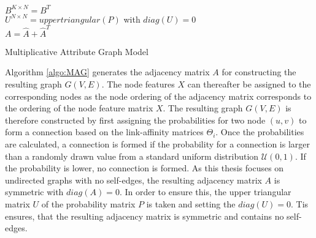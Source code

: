 	\begin{algorithm}[h]
		\scriptsize
		\SetAlgoLined
		\nl $B^{K \times N} = B^{T}$ \\
		\nl {}
		\nl $U^{N \times N} = uppertriangular(P)$ with $diag(U)=0$\\
		\nl {}
		\nl $A = \hat A + \hat A^{T}$

		\caption{Multiplicative Attribute Graph Model}
		\label{algo:MAG}
	\end{algorithm}

	\noindent Algorithm \ref{algo:MAG} generates the adjacency matrix $A$ for
	constructing the resulting graph $G(V,E)$. The node features $X$ can
	thereafter be assigned to the corresponding nodes as the node ordering of 
	the adjacency matrix corresponds to the ordering of the node feature matrix
	$X$. The resulting graph $G(V,E)$ is therefore constructed by first
	assigning the probabilities for two node $(u,v)$ to form a connection based 
	on the link-affinity matrices $\Theta_i$. Once the probabilities are
	calculated, a connection is formed if the probability for a connection is
	larger than a randomly drawn value from a standard uniform distribution
	$\mathcal{U}(0,1)$. If the probability is lower, no connection is formed.
	As this thesis focuses on undirected graphs with no self-edges, the
	resulting adjacency matrix $A$ is symmetric with $diag(A) = 0$. In order to
	ensure this, the upper triangular matrix $U$ of the probability matrix $P$ 
	is taken and setting the $diag(U)=0$. Tis ensures, that the resulting
	adjacency matrix is symmetric and contains no self-edges. 
